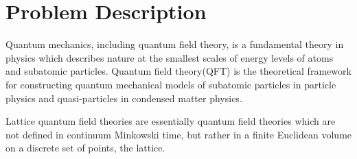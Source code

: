 \documentclass[preprint,12pt]{elsarticle}
\begin{document}

\section{Problem Description}
\label{S:1}
Quantum mechanics, including quantum field theory, is a fundamental theory in physics which describes nature at the smallest scales of energy levels of atoms and subatomic particles. Quantum field theory(QFT) is the theoretical framework for constructing quantum mechanical models of subatomic particles in particle physics and quasi-particles in condensed matter physics.

Lattice quantum field theories are essentially quantum field theories which are not defined
in continuum Minkowski time, but rather in a finite Euclidean volume on a discrete set
of points, the lattice. 
\end{document}
